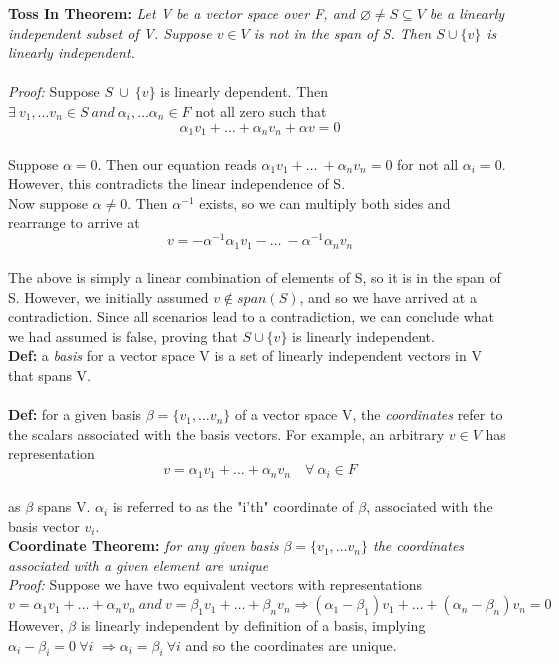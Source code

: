 \documentclass[12pt]{article}
\begin{document}
\textbf{Toss In Theorem: }\emph{Let V be a vector space over F, and $\varnothing \neq S \subseteq V$ be a linearly independent subset of V. Suppose $v \in V$ is not in the span of S. Then $S \cup \{ v \}$ is linearly independent.}\\\\
\emph{Proof: }Suppose $S\ \cup\ \{ v \}$ is linearly dependent. Then $\exists\ v_1,\dots v_n \in S\ and\ \alpha_i,\dots \alpha_n \in F$ not all zero such that $$\alpha_1 v_1 + \dots + \alpha_n v_n + \alpha v= 0$$\\
Suppose $\alpha = 0$. Then our equation reads $\alpha_1 v_1 + \dots\ + \alpha_n v_n = 0$ for not all $\alpha_i = 0$. However, this contradicts the linear independence of S.\\

Now suppose $\alpha \neq 0$. Then $\alpha^{-1}$ exists, so we can multiply both sides and rearrange to arrive at $$v =  -\alpha^{-1} \alpha_1 v_1 - \dots\ - \alpha^{-1} \alpha_n v_n$$\\
The above is simply a linear combination of elements of S, so it is in the span of S. However, we initially assumed $v \notin span(S)$, and so we have arrived at a contradiction. Since all scenarios lead to a contradiction, we can conclude what we had assumed is false, proving that $S \cup \{ v \}$ is linearly independent.\\

\textbf{Def: }a \emph{basis} for a vector space V is a set of linearly independent vectors in V that spans V.\\\\
\textbf{Def: }for a given basis $\beta = \{ v_1, \dots v_n \}$ of a vector space V, the \emph{coordinates} refer to the scalars associated with the basis vectors. For example, an arbitrary $v \in V$ has representation $$v = \alpha_1 v_1 + \dots + \alpha_n v_n \quad \forall\ \alpha_i \in F$$\\as $\beta$ spans V. $\alpha_i$ is referred to as the "i'th" coordinate of $\beta$, associated with the basis vector $v_i$. \\

\textbf{Coordinate Theorem: }\emph{for any given basis $\beta = \{ v_1,\dots v_n\}$ the coordinates associated with a given element are unique}\\

\emph{Proof: }Suppose we have two equivalent vectors with representations $$v = \alpha_1 v_1 + \dots + \alpha_n v_n \ and\ v = \beta_1 v_1 + \dots + \beta_n v_n \Rightarrow (\alpha_1 - \beta_1) v_1 + \dots + (\alpha_n - \beta_n) v_n = 0$$
However, $\beta$ is linearly independent by definition of a basis, implying $\alpha_i - \beta_i = 0\ \forall i$
$\Rightarrow \alpha_i = \beta_i\ \forall i$ and so the coordinates are unique.\\
\end{document}
